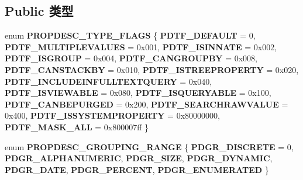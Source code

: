\subsection*{Public 类型}
\begin{DoxyCompactItemize}
\item 
\mbox{\label{interface_i_property_description_a289de93ea488622c0a6c829e4abb1235}} 
enum {\bfseries P\+R\+O\+P\+D\+E\+S\+C\+\_\+\+T\+Y\+P\+E\+\_\+\+F\+L\+A\+GS} \{ \newline
{\bfseries P\+D\+T\+F\+\_\+\+D\+E\+F\+A\+U\+LT} = 0, 
{\bfseries P\+D\+T\+F\+\_\+\+M\+U\+L\+T\+I\+P\+L\+E\+V\+A\+L\+U\+ES} = 0x001, 
{\bfseries P\+D\+T\+F\+\_\+\+I\+S\+I\+N\+N\+A\+TE} = 0x002, 
{\bfseries P\+D\+T\+F\+\_\+\+I\+S\+G\+R\+O\+UP} = 0x004, 
\newline
{\bfseries P\+D\+T\+F\+\_\+\+C\+A\+N\+G\+R\+O\+U\+P\+BY} = 0x008, 
{\bfseries P\+D\+T\+F\+\_\+\+C\+A\+N\+S\+T\+A\+C\+K\+BY} = 0x010, 
{\bfseries P\+D\+T\+F\+\_\+\+I\+S\+T\+R\+E\+E\+P\+R\+O\+P\+E\+R\+TY} = 0x020, 
{\bfseries P\+D\+T\+F\+\_\+\+I\+N\+C\+L\+U\+D\+E\+I\+N\+F\+U\+L\+L\+T\+E\+X\+T\+Q\+U\+E\+RY} = 0x040, 
\newline
{\bfseries P\+D\+T\+F\+\_\+\+I\+S\+V\+I\+E\+W\+A\+B\+LE} = 0x080, 
{\bfseries P\+D\+T\+F\+\_\+\+I\+S\+Q\+U\+E\+R\+Y\+A\+B\+LE} = 0x100, 
{\bfseries P\+D\+T\+F\+\_\+\+C\+A\+N\+B\+E\+P\+U\+R\+G\+ED} = 0x200, 
{\bfseries P\+D\+T\+F\+\_\+\+S\+E\+A\+R\+C\+H\+R\+A\+W\+V\+A\+L\+UE} = 0x400, 
\newline
{\bfseries P\+D\+T\+F\+\_\+\+I\+S\+S\+Y\+S\+T\+E\+M\+P\+R\+O\+P\+E\+R\+TY} = 0x80000000, 
{\bfseries P\+D\+T\+F\+\_\+\+M\+A\+S\+K\+\_\+\+A\+LL} = 0x800007ff
 \}
\item 
\mbox{\label{interface_i_property_description_a5650c2bb9c9905ecc79e361349665224}} 
enum {\bfseries P\+R\+O\+P\+D\+E\+S\+C\+\_\+\+G\+R\+O\+U\+P\+I\+N\+G\+\_\+\+R\+A\+N\+GE} \{ \newline
{\bfseries P\+D\+G\+R\+\_\+\+D\+I\+S\+C\+R\+E\+TE} = 0, 
{\bfseries P\+D\+G\+R\+\_\+\+A\+L\+P\+H\+A\+N\+U\+M\+E\+R\+IC}, 
{\bfseries P\+D\+G\+R\+\_\+\+S\+I\+ZE}, 
{\bfseries P\+D\+G\+R\+\_\+\+D\+Y\+N\+A\+M\+IC}, 
\newline
{\bfseries P\+D\+G\+R\+\_\+\+D\+A\+TE}, 
{\bfseries P\+D\+G\+R\+\_\+\+P\+E\+R\+C\+E\+NT}, 
{\bfseries P\+D\+G\+R\+\_\+\+E\+N\+U\+M\+E\+R\+A\+T\+ED}
 \}
\item 
\mbox{\label{interface_i_property_description_a1c978e2f62aac247f346d5901caefe13}} 

\end{DoxyCompactItemize}
